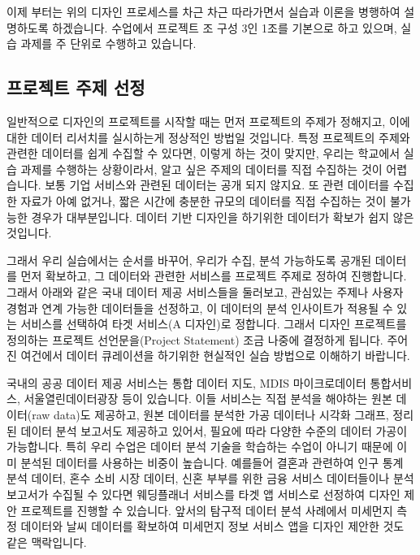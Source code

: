 \documentclass[
  letterpaper,
]{book}
\begin{document}
이제 부터는 위의 디자인 프로세스를 차근 차근 따라가면서 실습과 이론을
병행하여 설명하도록 하겠습니다. 수업에서 프로젝트 조 구성 3인 1조를
기본으로 하고 있으며, 실습 과제를 주 단위로 수행하고 있습니다.

\subsection{프로젝트 주제
선정}\label{uxd504uxb85cuxc81duxd2b8-uxc8fcuxc81c-uxc120uxc815}

일반적으로 디자인의 프로젝트를 시작할 때는 먼저 프로젝트의 주제가
정해지고, 이에 대한 데이터 리서치를 실시하는게 정상적인 방법일 것입니다.
특정 프로젝트의 주제와 관련한 데이터를 쉽게 수집할 수 있다면, 이렇게
하는 것이 맞지만, 우리는 학교에서 실습 과제를 수행하는 상황이라서, 알고
싶은 주제의 데이터를 직접 수집하는 것이 어렵습니다. 보통 기업 서비스와
관련된 데이터는 공개 되지 않지요. 또 관련 데이터를 수집한 자료가 아예
없거나, 짧은 시간에 충분한 규모의 데이터를 직접 수집하는 것이 불가능한
경우가 대부분입니다. 데이터 기반 디자인을 하기위한 데이터가 확보가 쉽지
않은 것입니다.

그래서 우리 실습에서는 순서를 바꾸어, 우리가 수집, 분석 가능하도록
공개된 데이터를 먼저 확보하고, 그 데이터와 관련한 서비스를 프로젝트
주제로 정하여 진행합니다. 그래서 아래와 같은 국내 데이터 제공 서비스들을
둘러보고, 관심있는 주제나 사용자 경험과 연계 가능한 데이터들을 선정하고,
이 데이터의 분석 인사이트가 적용될 수 있는 서비스를 선택하여 타겟
서비스(A 디자인)로 정합니다. 그래서 디자인 프로젝트를 정의하는 프로젝트
선언문을(Project Statement) 조금 나중에 결정하게 됩니다. 주어진 여건에서
데이터 큐레이션을 하기위한 현실적인 실습 방법으로 이해하기 바랍니다.

국내의 공공 데이터 제공 서비스는 통합 데이터 지도, MDIS 마이크로데이터
통합서비스, 서울열린데이터광장 등이 있습니다. 이들 서비스는 직접 분석을
해야하는 원본 데이터(raw data)도 제공하고, 원본 데이터를 분석한 가공
데이터나 시각화 그래프, 정리된 데이터 분석 보고서도 제공하고 있어서,
필요에 따라 다양한 수준의 데이터 가공이 가능합니다. 특히 우리 수업은
데이터 분석 기술을 학습하는 수업이 아니기 때문에 이미 분석된 데이터를
사용하는 비중이 높습니다. 예를들어 결혼과 관련하여 인구 통계 분석
데이터, 혼수 소비 시장 데이터, 신혼 부부를 위한 금융 서비스 데이터들이나
분석 보고서가 수집될 수 있다면 웨딩플래너 서비스를 타겟 앱 서비스로
선정하여 디자인 제안 프로젝트를 진행할 수 있습니다. 앞서의 탐구적 데이터
분석 사례에서 미세먼지 측정 데이터와 날씨 데이터를 확보하여 미세먼지
정보 서비스 앱을 디자인 제안한 것도 같은 맥락입니다.
\end{document}
